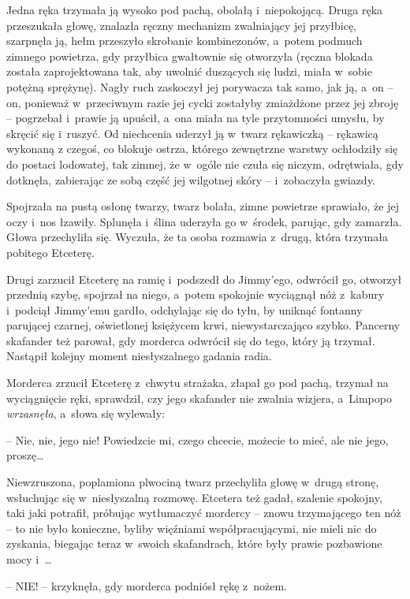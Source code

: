 \documentclass[oneside,polish,11pt,sfheadings]{mwbk}
\begin{document}
Jedna ręka trzymała ją wysoko pod pachą, obolałą i~niepokojącą. Druga
ręka przeszukała głowę, znalazła ręczny mechanizm zwalniający jej
przyłbicę, szarpnęła ją, hełm przeszyło skrobanie kombinezonów, a~potem
podmuch zimnego powietrza, gdy przyłbica gwałtownie się otworzyła
(ręczna blokada została zaprojektowana tak, aby uwolnić duszących się
ludzi, miała w~sobie potężną sprężynę). Nagły ruch zaskoczył jej
porywacza tak samo, jak ją, a~on -- on, ponieważ w~przeciwnym razie jej
cycki zostałyby zmiażdżone przez jej zbroję -- pogrzebał i~prawie ją
upuścił, a~ona miała na tyle przytomności umysłu, by skręcić się i~ruszyć. Od niechcenia uderzył ją w~twarz rękawiczką -- rękawicą wykonaną
z czegoś, co blokuje ostrza, którego zewnętrzne warstwy ochłodziły się
do postaci lodowatej, tak zimnej, że w~ogóle nie czuła się niczym,
odrętwiała, gdy dotknęła, zabierając ze sobą część jej wilgotnej skóry -- i~zobaczyła gwiazdy.

Spojrzała na pustą osłonę twarzy, twarz bolała, zimne powietrze
sprawiało, że jej oczy i~nos łzawiły. Splunęła i~ślina uderzyła go w~środek, parując, gdy zamarzła. Głowa przechyliła się. Wyczuła, że ta
osoba rozmawia z~drugą, która trzymała pobitego Etceterę.

Drugi zarzucił Etceterę na ramię i~podszedł do Jimmy'ego, odwrócił go,
otworzył przednią szybę, spojrzał na niego, a~potem spokojnie wyciągnął
nóż z~kabury i~podciął Jimmy'emu gardło, odchylając się do tyłu, by
uniknąć fontanny parującej czarnej, oświetlonej księżycem krwi,
niewystarczająco szybko. Pancerny skafander też parował, gdy morderca
odwrócił się do tego, który ją trzymał. Nastąpił kolejny moment
niesłyszalnego gadania radia.

Morderca zrzucił Etceterę z~chwytu strażaka, złapał go pod pachą,
trzymał na wyciągnięcie ręki, sprawdził, czy jego skafander nie zwalnia
wizjera, a~Limpopo \textit{wrzasnęła}, a~słowa się wylewały: 

-- Nie, nie,
jego nie! Powiedzcie mi, czego chcecie, możecie to mieć, ale nie jego,
proszę\ldots 

Niewzruszona, poplamiona plwociną twarz przechyliła głowę w~drugą
stronę, wsłuchując się w~niesłyszalną rozmowę. Etcetera też gadał,
szalenie spokojny, taki jaki potrafił, próbując wytłumaczyć mordercy -- znowu trzymającego ten nóż -- to nie było konieczne, byliby więźniami
współpracującymi, nie mieli nic do zyskania, biegając teraz w~swoich
skafandrach, które były prawie pozbawione mocy i~\ldots 

-- NIE! -- krzyknęła, gdy morderca podniósł rękę z~nożem. 
\end{document}
